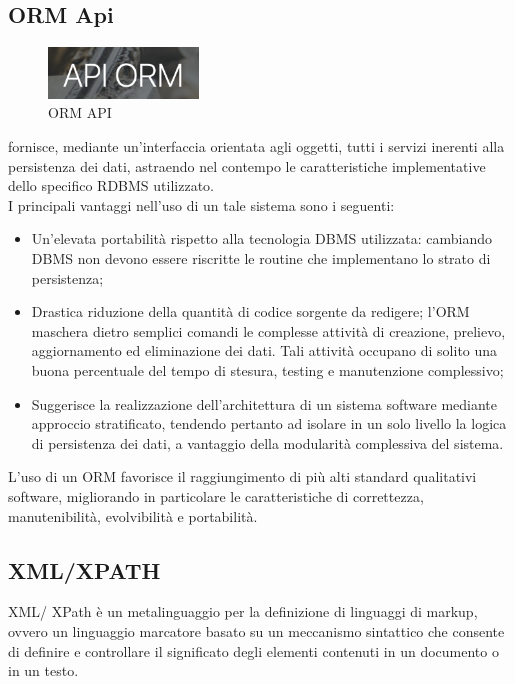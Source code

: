 \subsection{ORM Api}
\begin{figure}[H]
	\begin{center} \includegraphics[width=4cm]{figures/orm}
		\caption[ORM API]{ORM API}  
		\label{orm} 

	\end{center}
\end{figure}
 fornisce, mediante un'interfaccia orientata agli oggetti, tutti i servizi inerenti alla persistenza dei dati, astraendo nel contempo le caratteristiche implementative dello specifico RDBMS utilizzato. \\ 
I principali vantaggi nell'uso di un tale sistema sono i seguenti:
\begin{itemize}
\item Un'elevata portabilità rispetto alla tecnologia DBMS utilizzata: cambiando DBMS non devono essere riscritte le routine che implementano lo strato di persistenza;
\item Drastica riduzione della quantità di codice sorgente da redigere; l'ORM maschera dietro semplici comandi le complesse attività di creazione, prelievo, aggiornamento ed eliminazione dei dati.  Tali attività occupano di solito una buona percentuale del tempo di stesura, testing e manutenzione complessivo;
\item Suggerisce la realizzazione dell'architettura di un sistema software mediante approccio stratificato, tendendo pertanto ad isolare in un solo livello la logica di persistenza dei dati, a vantaggio della modularità complessiva del sistema.
\end{itemize}
L'uso di un ORM favorisce il raggiungimento di più alti standard qualitativi software, migliorando in particolare le caratteristiche di correttezza, manutenibilità, evolvibilità e portabilità.

\subsection{XML/XPATH}


 XML/ XPath è un metalinguaggio per la definizione di linguaggi di markup, ovvero un linguaggio marcatore basato su un meccanismo sintattico che consente di definire e controllare il significato degli elementi contenuti in un documento o in un testo.

